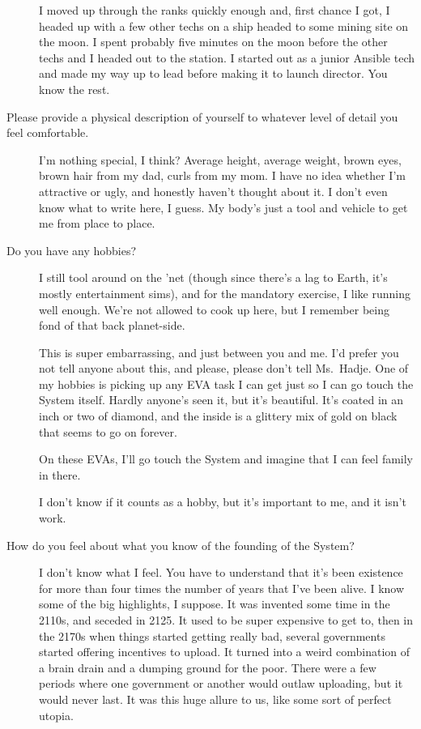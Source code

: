 \begin{description}
I moved up through the ranks quickly enough and, first chance I got, I headed up with a few other techs on a ship headed to some mining site on the moon. I spent probably five minutes on the moon before the other techs and I headed out to the station. I started out as a junior Ansible tech and made my way up to lead before making it to launch director. You know the rest.
\item[Please provide a physical description of yourself to whatever level of detail you feel comfortable.]
I'm nothing special, I think? Average height, average weight, brown eyes, brown hair from my dad, curls from my mom. I have no idea whether I'm attractive or ugly, and honestly haven't thought about it. I don't even know what to write here, I guess. My body's just a tool and vehicle to get me from place to place.
\item[Do you have any hobbies?]
I still tool around on the 'net (though since there's a lag to Earth, it's mostly entertainment sims), and for the mandatory exercise, I like running well enough. We're not allowed to cook up here, but I remember being fond of that back planet-side.

This is super embarrassing, and just between you and me. I'd prefer you not tell anyone about this, and please, please don't tell Ms.~Hadje. One of my hobbies is picking up any EVA task I can get just so I can go touch the System itself. Hardly anyone's seen it, but it's beautiful. It's coated in an inch or two of diamond, and the inside is a glittery mix of gold on black that seems to go on forever.

On these EVAs, I'll go touch the System and imagine that I can feel family in there.

I don't know if it counts as a hobby, but it's important to me, and it isn't work.
\item[How do you feel about what you know of the founding of the System?]
I don't know what I feel. You have to understand that it's been existence for more than four times the number of years that I've been alive. I know some of the big highlights, I suppose. It was invented some time in the 2110s, and seceded in 2125. It used to be super expensive to get to, then in the 2170s when things started getting really bad, several governments started offering incentives to upload. It turned into a weird combination of a brain drain and a dumping ground for the poor. There were a few periods where one government or another would outlaw uploading, but it would never last. It was this huge allure to us, like some sort of perfect utopia.


\end{description}
